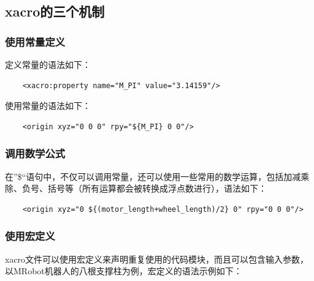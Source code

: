 \documentclass[9pt, oneside]{book}
\begin{document}
\subsection{xacro的三个机制}

\subsubsection{使用常量定义}

定义常量的语法如下：

\begin{verbatim}
    <xacro:property name="M_PI" value="3.14159"/>
\end{verbatim}

使用常量的语法如下：

\begin{verbatim}
    <origin xyz="0 0 0" rpy="${M_PI} 0 0"/>
\end{verbatim}

\subsubsection{调用数学公式}

在”\${}“语句中，不仅可以调用常量，还可以使用一些常用的数学运算，包括加减乘除、负号、括号等（所有运算都会被转换成浮点数进行），语法如下：

\begin{verbatim}
    <origin xyz="0 ${(motor_length+wheel_length)/2} 0" rpy="0 0 0"/>
\end{verbatim}

\subsubsection{使用宏定义}

xacro文件可以使用宏定义来声明重复使用的代码模块，而且可以包含输入参数，以MRobot机器人的八根支撑柱为例，宏定义的语法示例如下：
\end{document}

